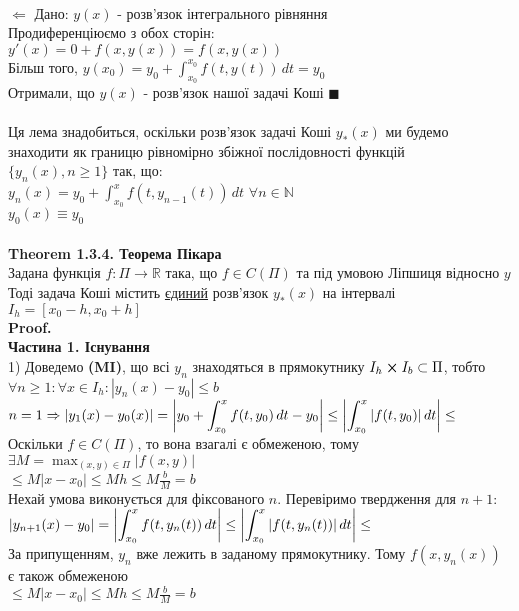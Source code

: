 \documentclass[a4paper, 14pt]{extarticle}
\def\huge{\displaystyle}
\def\th#1{\textbf{Theorem {#1}}}
\def\proof{\textbf{Proof.}\\}
\def\bigline{\vspace{5mm}\\}
\def\qed{$\blacksquare$}
\begin{document}
	\\
	$\boxed{\Leftarrow}$ Дано: $y(x)$ - розв'язок інтегрального рівняння\\
	Продиференціюємо з обох сторін:\\
	$\huge y'(x) = 0 + f(x,y(x)) = f(x,y(x))$\\
	Більш того, $\huge y(x_0) = y_0 + \int_{x_0}^{x_0} f(t,y(t))\,dt = y_0$\\
	Отримали, що $y(x)$ - розв'язок нашої задачі Коші \qed
	\\ \\
	Ця лема знадобиться, оскільки розв'язок задачі Коші $y_*(x)$ ми будемо знаходити як границю рівномірно збіжної послідовності функцій \\$\{y_n(x), n \geq 1\}$ так, що:\\
	$\huge y_n(x) = y_0 + \int_{x_0}^x f(t,y_{n-1}(t))\,dt$  $\forall n \in \mathbb{N}$\\
	$y_0(x) \equiv y_0$\\
	\bigline
	\th{1.3.4. Теорема Пікара}\\
	Задана функція $f: \Pi \rightarrow \mathbb{R}$ така, що $f \in C(\Pi)$ та під умовою Ліпшиця відносно $y$\\
	Тоді задача Коші містить \underline{єдиний} розв'язок $y_*(x)$ на інтервалі \\ $I_h = [x_0 - h, x_0 + h]$\\
	\proof
	\textbf{Частина 1. Існування}\\
	1) Доведемо \textbf{(MI)}, що всі $y_n$ знаходяться в прямокутнику $I_h \cross I_b \subset \Pi$, тобто $\forall n \geq1: \forall x \in I_h: |y_n(x)-y_0| \leq b$\\
	$n = 1 \Rightarrow \huge |y_1(x) - y_0(x)| = \abs{y_0 + \int_{x_0}^x f(t,y_0)\,dt - y_0} \leq \abs{\int_{x_0}^x |f(t,y_0)|\,dt} \leq$\\
	Оскільки $f \in C(\Pi)$, то вона взагалі є обмеженою, тому $\exists M = \huge \max_{(x,y)\in \Pi} |f(x,y)|$\\
	$\huge \leq M |x-x_0| \leq Mh \leq M \frac{b}{M}=b$\\
	Нехай умова виконується для фіксованого $n$. Перевіримо твердження для $n+1$:\\
	$\huge |y_{n+1}(x)-y_0| = \abs{\int_{x_0}^x f(t,y_n(t))\,dt} \leq \abs{\int_{x_0}^x |f(t,y_{n}(t))|\,dt} \leq$\\
	За припущенням, $y_n$ вже лежить в заданому прямокутнику. Тому $f(x,y_n(x))$ є також обмеженою\\
	$\huge \leq M|x-x_0| \leq Mh \leq M\frac{b}{M}= b$\\
\end{document}
